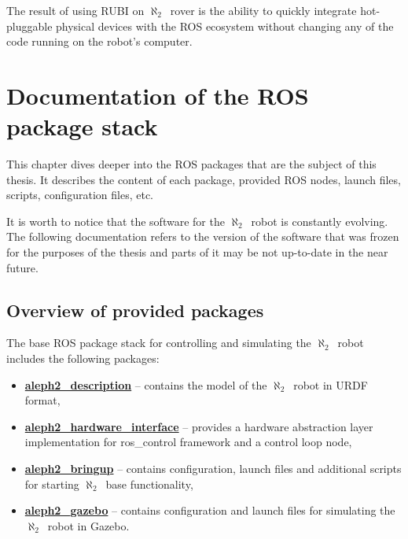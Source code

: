 \documentclass[english,inz,shortabstract]{iithesis}
\newcommand{\rovername}{$\aleph_2$\ }
\begin{document}
    The result of using RUBI on \rovername rover is the ability to quickly integrate hot-pluggable physical devices with the ROS ecosystem without changing any of the code running on the robot's computer.


\chapter{Documentation of the ROS package stack}

This chapter dives deeper into the ROS packages that are the subject of this thesis. It describes the content of each package, provided ROS nodes, launch files, scripts, configuration files, etc.

It is worth to notice that the software for the \rovername robot is constantly evolving. The following documentation refers to the version of the software that was frozen for the purposes of the thesis and parts of it may be not up-to-date in the near future.

\section{Overview of provided packages}

    The base ROS package stack for controlling and simulating the \rovername robot includes the following packages:

    \begin{itemize}
        \item \href{https://gitlab.continuum.ii.uni.wroc.pl/continuum/software/aleph2_description}{\textbf{aleph2\_description}} -- 
        contains the model of the \rovername robot in URDF format,
        \item \href{https://gitlab.continuum.ii.uni.wroc.pl/continuum/software/aleph2_hardware_interface}{\textbf{aleph2\_hardware\_interface}} -- 
        provides a hardware abstraction layer implementation for \textsf{ros\_control} framework and a control loop node,
        \item \href{https://gitlab.continuum.ii.uni.wroc.pl/continuum/software/aleph2_bringup}{\textbf{aleph2\_bringup}} -- 
        contains configuration, launch files and additional scripts for starting \rovername base functionality,
        \item \href{https://gitlab.continuum.ii.uni.wroc.pl/continuum/software/aleph2_gazebo}{\textbf{aleph2\_gazebo}} -- 
        contains configuration and launch files for simulating the \rovername robot in Gazebo.
    \end{itemize}
\end{document}
